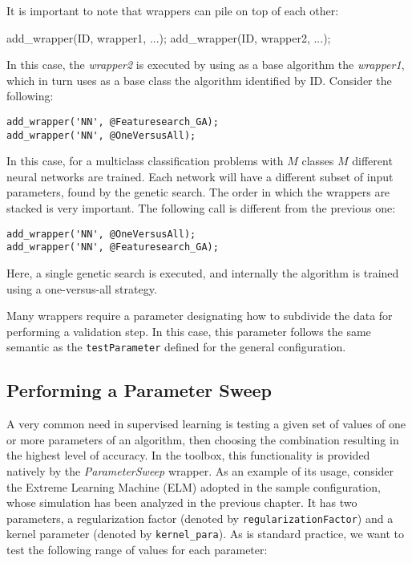 It is important to note that wrappers can pile on top of each other:

\begin{console}
add_wrapper(ID, wrapper1, ...);
add_wrapper(ID, wrapper2, ...);
\end{console}

In this case, the \textit{wrapper2} is executed by using as a base algorithm the \textit{wrapper1}, which in turn uses as a base class the algorithm identified by ID. Consider the following:

\begin{lstlisting}
add_wrapper('NN', @Featuresearch_GA);
add_wrapper('NN', @OneVersusAll);
\end{lstlisting}

\noindent In this case, for a multiclass classification problems with $M$ classes $M$ different neural networks are trained. Each network will have a different subset of input parameters, found by the genetic search. The order in which the wrappers are stacked is very important. The following call is different from the previous one:

\begin{lstlisting}
add_wrapper('NN', @OneVersusAll);
add_wrapper('NN', @Featuresearch_GA);
\end{lstlisting}

\noindent Here, a single genetic search is executed, and internally the algorithm is trained using a one-versus-all strategy.

Many wrappers require a parameter designating how to subdivide the data for performing a validation step. In this case, this parameter follows the same semantic as the \verb|testParameter| defined for the general configuration.

\subsection{Performing a Parameter Sweep}
\label{sec:parametersweep}

A very common need in supervised learning is testing a given set of values of one or more parameters of an algorithm, then choosing the combination resulting in the highest level of accuracy. In the toolbox, this functionality is provided natively by the \textit{ParameterSweep} wrapper. As an example of its usage, consider the Extreme Learning Machine (ELM) adopted in the sample configuration, whose simulation has been analyzed in the previous chapter. It has two parameters, a regularization factor (denoted by \verb|regularizationFactor|) and a kernel parameter (denoted by \verb|kernel_para|). As is standard practice, we want to test the following range of values for each parameter:

